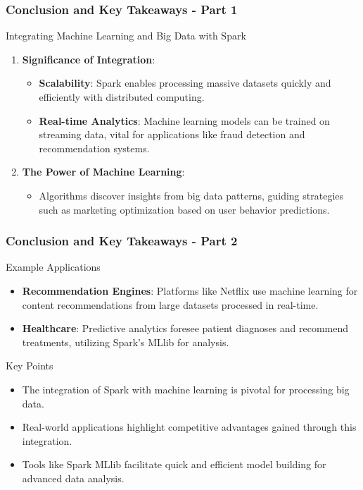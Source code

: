 \documentclass[aspectratio=169]{beamer}
\begin{document}
\begin{frame}[fragile]
    \frametitle{Conclusion and Key Takeaways - Part 1}
    \begin{block}{Integrating Machine Learning and Big Data with Spark}
        \begin{enumerate}
            \item \textbf{Significance of Integration}:
            \begin{itemize}
                \item \textbf{Scalability}: Spark enables processing massive datasets quickly and efficiently with distributed computing.
                \item \textbf{Real-time Analytics}: Machine learning models can be trained on streaming data, vital for applications like fraud detection and recommendation systems.
            \end{itemize}

            \item \textbf{The Power of Machine Learning}:
            \begin{itemize}
                \item Algorithms discover insights from big data patterns, guiding strategies such as marketing optimization based on user behavior predictions.
            \end{itemize}
        \end{enumerate}
    \end{block}
\end{frame}

\begin{frame}[fragile]
    \frametitle{Conclusion and Key Takeaways - Part 2}
    \begin{block}{Example Applications}
        \begin{itemize}
            \item \textbf{Recommendation Engines}: Platforms like Netflix use machine learning for content recommendations from large datasets processed in real-time.
            \item \textbf{Healthcare}: Predictive analytics foresee patient diagnoses and recommend treatments, utilizing Spark's MLlib for analysis.
        \end{itemize}
    \end{block}

    \begin{block}{Key Points}
        \begin{itemize}
            \item The integration of Spark with machine learning is pivotal for processing big data.
            \item Real-world applications highlight competitive advantages gained through this integration.
            \item Tools like Spark MLlib facilitate quick and efficient model building for advanced data analysis.
        \end{itemize}
    \end{block}
\end{frame}
\end{document}
